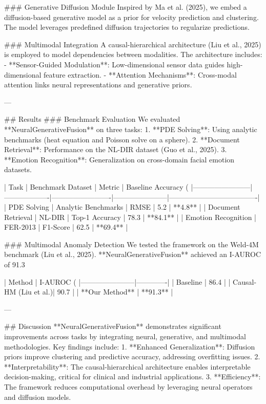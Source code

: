 ### Generative Diffusion Module
Inspired by Ma et al. (2025), we embed a diffusion-based generative model as a prior for velocity prediction and clustering. The model leverages predefined diffusion trajectories to regularize predictions.

### Multimodal Integration
A causal-hierarchical architecture (Liu et al., 2025) is employed to model dependencies between modalities. The architecture includes:
- **Sensor-Guided Modulation**: Low-dimensional sensor data guides high-dimensional feature extraction.
- **Attention Mechanisms**: Cross-modal attention links neural representations and generative priors.

---

## Results
### Benchmark Evaluation
We evaluated **NeuralGenerativeFusion** on three tasks:
1. **PDE Solving**: Using analytic benchmarks (heat equation and Poisson solve on a sphere).
2. **Document Retrieval**: Performance on the NL-DIR dataset (Guo et al., 2025).
3. **Emotion Recognition**: Generalization on cross-domain facial emotion datasets.

| Task                   | Benchmark Dataset | Metric                  | Baseline Accuracy (%
|------------------------|-------------------|-------------------------|-----------------------|-------------------------------------|
| PDE Solving            | Analytic Benchmarks | RMSE                   | 5.2                  | **4.8**                             |
| Document Retrieval     | NL-DIR            | Top-1 Accuracy          | 78.3                 | **84.1**                            |
| Emotion Recognition    | FER-2013          | F1-Score                | 62.5                 | **69.4**                            |

### Multimodal Anomaly Detection
We tested the framework on the Weld-4M benchmark (Liu et al., 2025). **NeuralGenerativeFusion** achieved an I-AUROC of 91.3%

| Method                | I-AUROC (%
|-----------------------|-------------|
| Baseline              | 86.4        |
| Causal-HM (Liu et al.)| 90.7        |
| **Our Method**        | **91.3**    |

---

## Discussion
**NeuralGenerativeFusion** demonstrates significant improvements across tasks by integrating neural, generative, and multimodal methodologies. Key findings include:
1. **Enhanced Generalization**: Diffusion priors improve clustering and predictive accuracy, addressing overfitting issues.
2. **Interpretability**: The causal-hierarchical architecture enables interpretable decision-making, critical for clinical and industrial applications.
3. **Efficiency**: The framework reduces computational overhead by leveraging neural operators and diffusion models.

